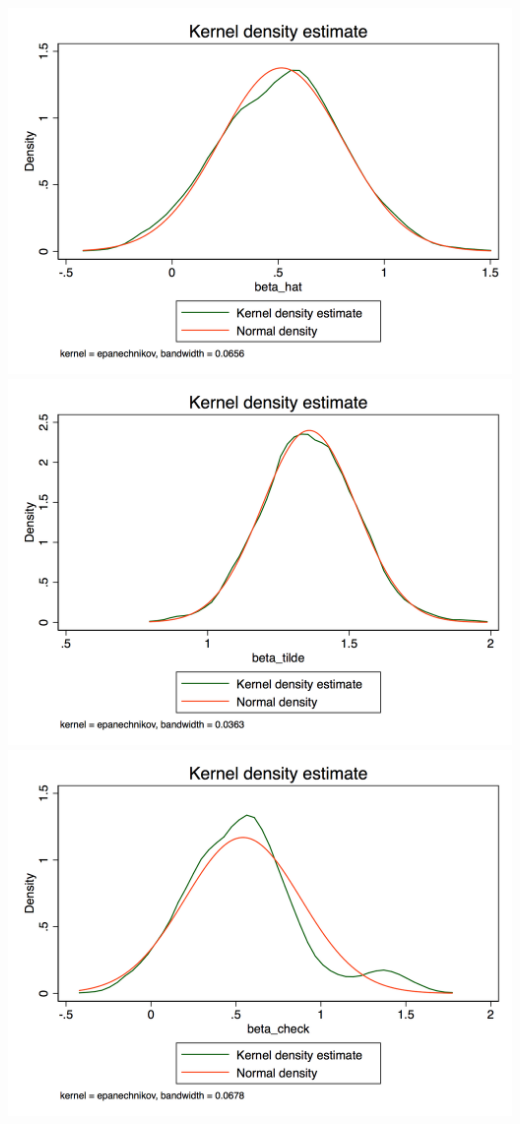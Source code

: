 \documentclass[12pt]{article}
\begin{document}
\includegraphics[totalheight=5cm]{hw4_q3_bhat_stata.png}
\includegraphics[totalheight=5cm]{hw4_q3_btilde_stata.png}\\
\includegraphics[totalheight=5cm]{hw4_q3_bcheck_stata.png}
\end{document}
